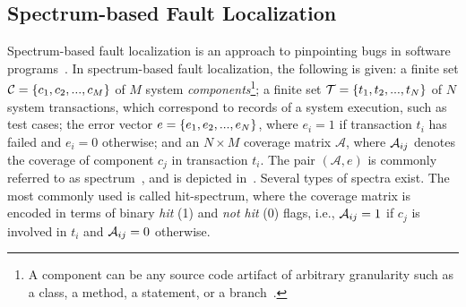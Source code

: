 \documentclass[sigplan,10pt,review,anonymous]{acmart}\settopmatter{printfolios=true,printccs=false,printacmref=false}
\begin{document}



\subsection{Spectrum-based Fault Localization}
\label{sec:sfl}

Spectrum-based fault localization is an approach to pinpointing bugs
in software programs~\cite{FLSurvey2016, DBLP:conf/kbse/JonesH05,
  DBLP:journals/smr/LuciaLJTB14, DBLP:journals/jss/AbreuZGG09}.  In
spectrum-based fault localization, the following is given: a finite
set $\mathcal{C} = \{{}c_1,c_2,...,c_M\}$ of $M$ system
\emph{components}\footnote{A component can be any source code artifact
  of arbitrary granularity such as a class, a method, a statement, or
  a branch~\cite{DBLP:journals/stvr/HarroldRSWY00}.}; a finite set
$\mathcal{T} = \{{}t_1,t_2,...,t_N\}$ of $N$ system transactions,
which correspond to records of a system execution, such as test cases;
the error vector $e = \{{}e_1,e_2,...,e_N\}$, where $e_i = 1$ if
transaction $t_i$ has failed and $e_i = 0$ otherwise; and an $N \times
M$ coverage matrix $\mathcal{A}$, where $\mathcal{A}_{ij}$ denotes the
coverage of component $c_j$ in transaction $t_i$.
The pair $(\mathcal{A},e)$ is commonly referred to as
spectrum~\cite{DBLP:journals/stvr/HarroldRSWY00}, and is depicted in~\cite{fig:spectrum-example}.
Several types of spectra exist.
The most commonly used is called hit-spectrum, where the coverage matrix is encoded in terms of
binary \emph{hit} (1) and \emph{not hit} (0) flags, i.e.,
$\mathcal{A}_{ij} = 1$ if $c_j$ is involved in $t_i$ and $\mathcal{A}_{ij} = 0$
otherwise.
\end{document}

